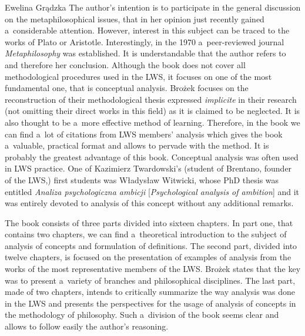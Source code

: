 \begin{newrevengenv}{Ewelina Grądzka}
The author's intention is to participate in the general discussion on the metaphilosophical issues, that in her opinion just recently gained a~considerable attention. However, interest in this subject can be traced to the works of Plato or Aristotle. Interestingly, in the 1970 a~peer-reviewed journal \textit{Metaphilosophy} was established. It is understandable that the author refers to
\parencites{williamson_philosophy_2007}{rescher_metaphilosophy_2014}[or][]{doro_cambridge_2017}
 and therefore her conclusion. Although the book does not cover all methodological procedures used in the LWS, it focuses on one of the most fundamental one, that is conceptual analysis. Brożek focuses on the reconstruction of their methodological thesis expressed \textit{implicite} in their research (not omitting their direct works in this field) as it is claimed to be neglected. It is also thought to be a~more effective method of learning. Therefore, in the book we can find a~lot of citations from LWS members' analysis which gives the book a~valuable, practical format and allows to pervade with the method. It is probably the greatest advantage of this book. Conceptual analysis was often used in LWS practice. One of Kazimierz Twardowski's (student of Brentano, founder of the LWS,) first students was Władysław Witwicki, whose PhD thesis was entitled \textit{Analiza psychologiczna ambicji} [\textit{Psychological analysis of ambition}] 
\parencite[][]{witwicki_analiza_1934} %
and it was entirely devoted to analysis of this concept without any additional remarks.

The book consists of three parts divided into sixteen chapters. In part one, that contains two chapters, we can find a~theoretical introduction to the subject of analysis of concepts and formulation of definitions. The second part, divided into twelve chapters, is focused on the presentation of examples of analysis from the works of the most representative members of the LWS. Brożek states that the key was to present a~variety of branches and philosophical disciplines. The last part, made of two chapters, intends to critically summarize the way analysis was done in the LWS and presents the perspectives for the usage of analysis of concepts in the methodology of philosophy. Such a~division of the book seems clear and allows to follow easily the author's reasoning.


\end{newrevengenv}

